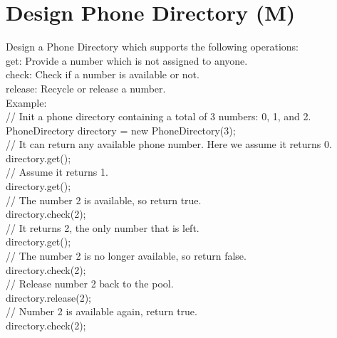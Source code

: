 \section{Design Phone Directory (M)}
Design a Phone Directory which supports the following operations:\\
    get: Provide a number which is not assigned to anyone.\\
    check: Check if a number is available or not.\\
    release: Recycle or release a number.\\

Example:\\
// Init a phone directory containing a total of 3 numbers: 0, 1, and 2.\\
PhoneDirectory directory = new PhoneDirectory(3);\\

// It can return any available phone number. Here we assume it returns 0.\\
directory.get();\\

// Assume it returns 1.\\
directory.get();\\

// The number 2 is available, so return true.\\
directory.check(2);\\

// It returns 2, the only number that is left.\\
directory.get();\\

// The number 2 is no longer available, so return false.\\
directory.check(2);\\

// Release number 2 back to the pool.\\
directory.release(2);\\

// Number 2 is available again, return true.\\
directory.check(2);\\


